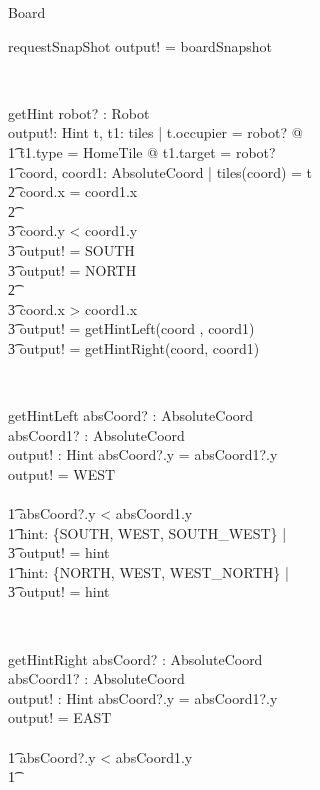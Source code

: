 \documentclass[12pt]{article}
\begin{document}
\begin{class}{Board}
\begin{schema}{requestSnapShot}
output! = boardSnapshot
\end{schema} \\
\begin{schema}{getHint}
robot? : Robot \\
output!: Hint
\where
\exists t, t1: \ran tiles | t.occupier = robot? @\\ \t1
t1.type = HomeTile @ t1.target = robot? \\ \t1
\exists coord, coord1: AbsoluteCoord | tiles(coord) = t \\ \t2
\IF coord.x = coord1.x \\ \t2
\THEN \\ \t3
\IF coord.y < coord1.y \\ \t3
\THEN output! = SOUTH \\ \t3
\ELSE output! = NORTH \\ \t2
\ELSE \\ \t3
\IF coord.x > coord1.x \\ \t3
\THEN output! = getHintLeft(coord , coord1) \\ \t3
\ELSE output! = getHintRight(coord, coord1)
\end{schema} \\
\znewpage
\begin{schema}{getHintLeft}
absCoord? : AbsoluteCoord \\
absCoord1? : AbsoluteCoord \\
output! : Hint
\where
\IF absCoord?.y = absCoord1?.y \\
\THEN output! = WEST \\
\ELSE \\ \t1
\IF absCoord?.y < absCoord1.y \\ \t1
\THEN \exists hint: \{SOUTH, WEST, SOUTH\_WEST\} | \\ \t3 output! = hint \\ \t1
\ELSE \exists hint: \{NORTH, WEST, WEST\_NORTH\} | \\ \t3 output! = hint
\end{schema}\\
\begin{schema}{getHintRight}
absCoord? : AbsoluteCoord \\
absCoord1? : AbsoluteCoord \\
output! : Hint
\where
\IF absCoord?.y = absCoord1?.y \\
\THEN output! = EAST \\
\ELSE \\ \t1
\IF absCoord?.y < absCoord1.y \\ \t1

\end{schema}
\end{class}
\end{document}
